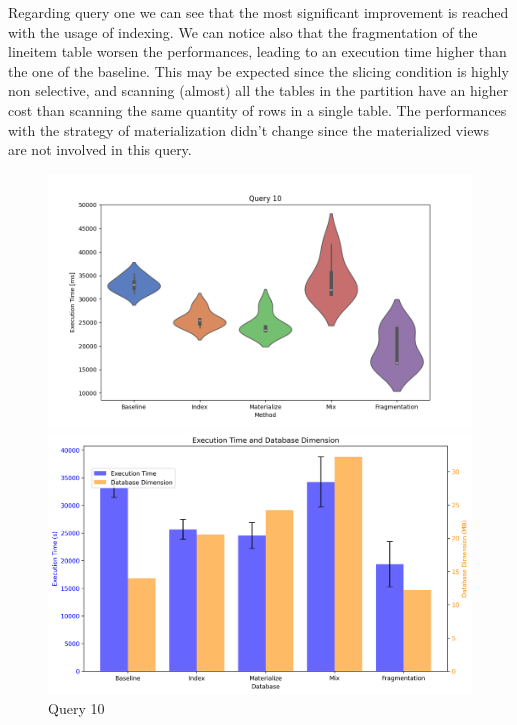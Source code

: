 Regarding query one we can see that the most significant improvement is reached with the usage of indexing. We can notice also that the fragmentation of the lineitem table worsen the performances, leading to an execution time higher than the one of the baseline. This may be expected since the slicing condition is highly non selective, and scanning (almost) all the tables in the partition have an higher cost than scanning the same quantity of rows in a single table.
The performances with the strategy of materialization didn't change since the materialized views are not involved in this query.

\begin{figure}[h!] 
\centering 
\begin{minipage}{0.5\textwidth} 
\centering \includegraphics[width=\linewidth]{images/query10.png}  
\end{minipage}
\begin{minipage}{0.45\textwidth} 
\centering 
\includegraphics[width=\linewidth]{images/double_barplot_q10.png} 
\end{minipage} 
\caption{Query 10} 
\end{figure}

